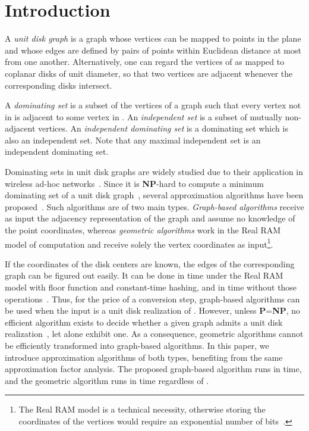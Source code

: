 \documentclass[preprint,12pt]{elsarticle}
\begin{document}
\section{Introduction}

A \emph{unit disk graph}  is a graph whose  vertices can be mapped to points in the plane and whose  edges are defined by pairs of points within Euclidean distance at most  from one another. Alternatively, one can regard the vertices of  as mapped to coplanar disks of unit diameter, so that two vertices are adjacent whenever the corresponding disks intersect.

A \emph{dominating set}  is a subset of the vertices of a graph such that every vertex not in  is adjacent to some vertex in . An \emph{independent set} is a subset of mutually non-adjacent vertices. An \emph{independent dominating set} is a dominating set which is also an independent set. Note that any maximal independent set is an independent dominating set.

Dominating sets in unit disk graphs are widely studied due to their application in wireless ad-hoc networks~\cite{heuristics}. Since it is \textbf{NP}-hard to compute a minimum dominating set of a unit disk graph~\cite{udg}, several approximation algorithms have been proposed~\cite{cccg,erlebach10,esa-Gibson,ptas-geometric,heuristics,ptas-graph-journal,zou11}. Such algorithms are of two main types. \emph{Graph-based algorithms} receive as input the adjacency representation of the graph and assume no knowledge of the point coordinates, whereas \emph{geometric algorithms} work in the Real RAM model of computation and receive solely the vertex coordinates as input\footnote{The Real RAM model is a technical necessity, otherwise storing the coordinates of the vertices would require an exponential number of bits~\cite{integer}.}. 

If the coordinates of the  disk centers are known, the  edges of the corresponding graph  can be figured out easily. It can be done in  time under the Real RAM model with floor function and constant-time hashing, and in  time without those operations~\cite{bentley}. Thus, for the price of a conversion step, graph-based algorithms can be used when the input is a unit disk realization of . However, unless \textbf{P}=\textbf{NP}, no efficient algorithm exists to decide whether a given graph admits a unit disk realization~\cite{breu}, let alone exhibit one. As a consequence, geometric algorithms cannot be efficiently transformed into graph-based algorithms. In this paper, we introduce approximation algorithms of both types, benefiting from the same approximation factor analysis. The proposed graph-based algorithm runs in  time, and the geometric algorithm runs in  time regardless of .
\end{document}
